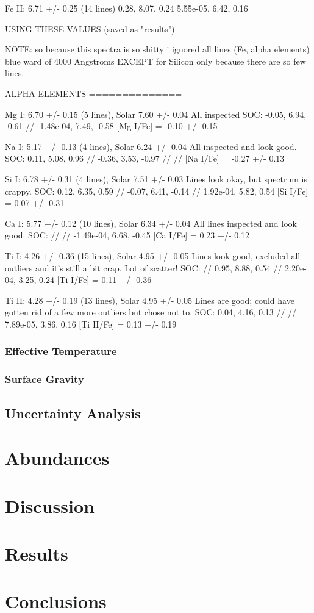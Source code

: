 \documentclass{emulateapj}
\begin{document}
Fe II: 6.71 +/- 0.25 (14 lines)
0.28, 8.07, 0.24
5.55e-05, 6.42, 0.16

USING THESE VALUES (saved as "results")

NOTE: so because this spectra is so shitty i ignored all lines (Fe, alpha elements) blue ward of 4000 Angstroms EXCEPT for Silicon only because there are so few lines.

ALPHA ELEMENTS
==============

Mg I: 6.70 +/- 0.15 (5 lines), Solar 7.60 +/- 0.04
All inspected
SOC: -0.05, 6.94, -0.61 // -1.48e-04, 7.49, -0.58
[Mg I/Fe] = -0.10 +/- 0.15

Na I: 5.17 +/- 0.13 (4 lines), Solar 6.24 +/- 0.04
All inspected and look good.
SOC: 0.11, 5.08, 0.96 // -0.36, 3.53, -0.97 // //
[Na I/Fe] = -0.27 +/- 0.13


Si I: 6.78 +/- 0.31 (4 lines), Solar 7.51 +/- 0.03
Lines look okay, but spectrum is crappy.
SOC: 0.12, 6.35, 0.59 // -0.07, 6.41, -0.14 // 1.92e-04, 5.82, 0.54
[Si I/Fe] = 0.07 +/- 0.31


Ca I: 5.77 +/- 0.12 (10 lines), Solar 6.34 +/- 0.04
All lines inspected and look good.
SOC: // // -1.49e-04, 6.68, -0.45
[Ca I/Fe] = 0.23 +/- 0.12

Ti I: 4.26 +/- 0.36 (15 lines), Solar 4.95 +/- 0.05
Lines look good, excluded all outliers and it's still a bit crap. Lot of scatter!
SOC: // 0.95, 8.88, 0.54 // 2.20e-04, 3.25, 0.24
[Ti I/Fe] = 0.11 +/- 0.36

Ti II: 4.28 +/- 0.19 (13 lines), Solar 4.95 +/- 0.05
Lines are good; could have gotten rid of a few more outliers but chose not to.
SOC: 0.04, 4.16, 0.13 // // 7.89e-05, 3.86, 0.16
[Ti II/Fe] = 0.13 +/- 0.19


\subsubsection{Effective Temperature}

\subsubsection{Surface Gravity}

\subsection{Uncertainty Analysis}


\section{Abundances}


\section{Discussion}

\section{Results}

\section{Conclusions}
\end{document}
